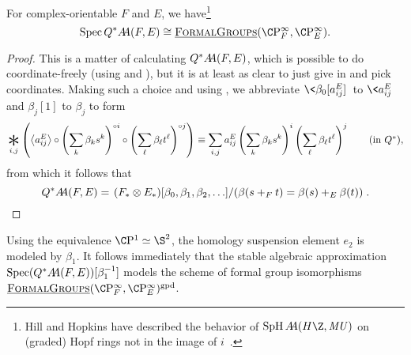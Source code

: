 \begin{corollary}
For complex-orientable \(F\) and \(E\), we have\footnote{Hill and Hopkins have described the behavior of \(\SpH \AA(H\Z, \MU)\) on (graded) Hopf rings not in the image of \(i\)~\cite[Definition 1.22]{HillHopkins}.} \[\Spec Q^* \AA(F, E) \cong \InternalHom{FormalGroups}(\CP^\infty_F, \CP^\infty_E).\]
\end{corollary}
\begin{proof}
This is a matter of calculating \(Q^* \AA(F, E)\), which is possible to do coordinate-freely (using  and \cite[Proposition 6.15]{StricklandFSFG}), but it is at least as clear to just give in and pick coordinates.  Making such a choice and using , we abbreviate \(\<\beta_0[a_{ij}^E]\>\) to \(\<a_{ij}^E\>\) and \(\beta_j[1]\) to \(\beta_j\) to form \[\bigast_{i, j} \left(\left\langle a_{ij}^E\right\rangle \circ \left( \sum_k \beta_k s^k \right)^{\circ i} \circ \left( \sum_\ell \beta_\ell t^\ell \right)^{\circ j} \right) \equiv \sum_{i, j} a_{ij}^E \left( \sum_k \beta_k s^k \right)^i \left( \sum_\ell \beta_\ell t^\ell \right)^j \tag{in \(Q^*\)},\] from which it follows that \[Q^* \AA(F, E) = \left. (F_* \otimes E_*)[\beta_0, \beta_1, \beta_2, \ldots] \middle/ \left( \beta(s +_F t) = \beta(s) +_E \beta(t) \right) \right. . \qedhere\]
\end{proof}

\begin{remark}
Using the equivalence \(\CP^1 \simeq \S^2\), the homology suspension element \(e_2\) is modeled by \(\beta_1\).  It follows immediately that the stable algebraic approximation \(\Spec (Q^* \AA(F, E))[\beta_1^{-1}]\) models the scheme of formal group isomorphisms \(\InternalHom{FormalGroups}(\CP^\infty_F, \CP^\infty_E)^{\mathrm{gpd}}\).
\end{remark}

